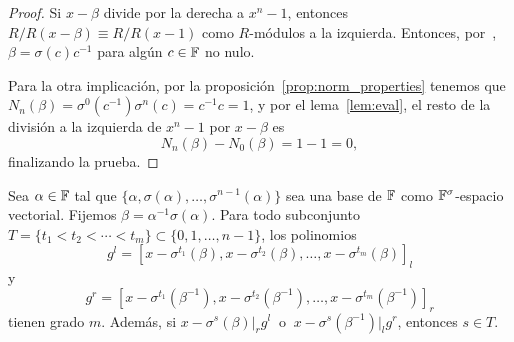 \begin{proof}
Si \(x - \beta\) divide por la derecha a  \(x^{n} -1\), entonces \(R / R(x - \beta) \equiv R / R(x-1)\) como \(R\)-módulos a la izquierda. Entonces, por~\cite[Proposición 2.4]{Leroy95pseudolinear}, \(\beta = \sigma(c)c^{-1}\) para algún \(c \in \mathbb{F}\) no nulo.

Para la otra implicación, por la proposición~\ref{prop:norm_properties} tenemos que \(N_n(\beta) = \sigma^{0}(c^{-1})\sigma^{n}(c) = c^{-1}c = 1\), y por el lema~\ref{lem:eval}, el resto de la división a la izquierda de \(x^{n} - 1\) por \(x - \beta\) es
    \[
    N_n(\beta) - N_0(\beta) = 1 - 1 = 0
    ,\]
finalizando la prueba.



\end{proof}

\begin{lemma}
\label{lem:deg_lcm}
    Sea \(\alpha \in \mathbb{F}\) tal que \(\{\alpha, \sigma(\alpha), \dots, \sigma^{n-1}(\alpha)\}\) sea una base de \(\mathbb{F}\) como  \(\mathbb{F}^\sigma\)-espacio vectorial. Fijemos  \(\beta = \alpha^{-1}\sigma(\alpha)\). Para todo subconjunto \(T = \{t_1 < t_2 < \cdots < t_m\} \subset \{0, 1, \dots, n-1\}\), los polinomios
    \[
    g^l = [x - \sigma^{t_1}(\beta), x - \sigma^{t_2}(\beta), \dots, x - \sigma^{t_m}(\beta)]_l
    \]
y
    \[
    g^r = [x - \sigma^{t_1}(\beta^{-1}), x - \sigma^{t_2}(\beta^{-1}), \dots, x - \sigma^{t_m}(\beta^{-1})]_r
    \]
tienen grado \(m\). Además, si \(x - \sigma^s(\beta) |_r g^l\ \) o \(\ x - \sigma^s(\beta^{-1}) |_l g^r\), entonces \(s \in T\).
\end{lemma}

